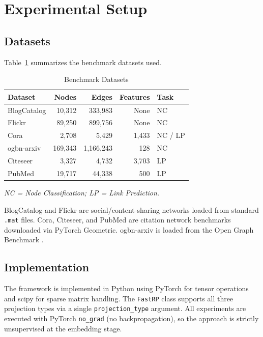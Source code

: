 \documentclass[conference]{IEEEtran}
\begin{document}
\section{Experimental Setup}
\label{sec:setup}

\subsection{Datasets}

Table~\ref{tab:datasets} summarizes the benchmark datasets used.

\begin{table}[ht]
\centering
\caption{Benchmark Datasets}
\label{tab:datasets}
\begin{tabular}{lrrrl}
\toprule
\textbf{Dataset} & \textbf{Nodes} & \textbf{Edges} & \textbf{Features} & \textbf{Task} \\
\midrule
BlogCatalog & 10,312 & 333,983 & None & NC \\
Flickr      & 89,250 & 899,756 & None & NC \\
Cora        & 2,708  & 5,429   & 1,433 & NC / LP \\
ogbn-arxiv  & 169,343 & 1,166,243 & 128 & NC \\
Citeseer    & 3,327  & 4,732   & 3,703 & LP \\
PubMed      & 19,717 & 44,338  & 500  & LP \\
\bottomrule
\end{tabular}
\end{table}

\textit{NC = Node Classification; LP = Link Prediction.}

BlogCatalog and Flickr are social/content-sharing networks loaded from
standard \texttt{.mat} files. Cora, Citeseer, and PubMed are citation
network benchmarks downloaded via PyTorch Geometric. ogbn-arxiv is loaded
from the Open Graph Benchmark \cite{hu2020ogb}.

\subsection{Implementation}

The framework is implemented in Python using PyTorch for tensor operations
and scipy for sparse matrix handling. The \texttt{FastRP} class supports
all three projection types via a single \texttt{projection\_type} argument.
All experiments are executed with PyTorch \texttt{no\_grad} (no
backpropagation), so the approach is strictly unsupervised at the embedding
stage.
\end{document}

